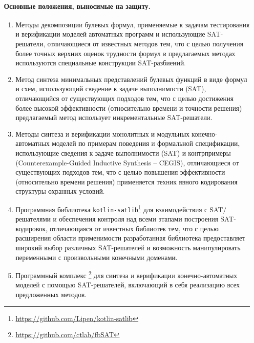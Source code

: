 %
%
\paragraph{Основные положения, выносимые на защиту.}
%
%
\begin{enumerate}[beginpenalty=10000]
    \item Методы декомпозиции булевых формул, применяемые к задачам тестирования и верификации моделей автоматных программ и использующие SAT-решатели, отличающиеся от известных методов тем, что с целью получения более точных верхних оценок трудности формул в предлагаемых методах используются специальные конструкции SAT-разбиений.

    \item Метод синтеза минимальных представлений булевых функций в виде формул и схем, использующий сведение к задаче выполнимости (SAT), отличающийся от существующих подходов тем, что с целью достижения более высокой эффективности (относительно времени и точности решения) предлагаемый метод использует инкрементальные SAT-решатели.

    \item Методы синтеза и верификации монолитных и модульных конечно-автоматных моделей по примерам поведения и формальной спецификации, использующие сведения к задаче выполнимости (SAT) и контрпримеры (Counterexample-Guided Inductive Synthesis \--- CEGIS), отличающиеся от существующих подходов тем, что с целью повышения эффективности (относительно времени решения) применяется техник явного кодирования структуры охранных условий.

    \item Программная библиотека \texttt{kotlin-satlib}\footnote{\url{https://github.com/Lipen/kotlin-satlib}} для взаимодействия с SAT\-/решателями и обеспечения контроля над всеми этапами построения SAT-кодировок, отличающаяся от известных библиотек тем, что с целью расширения области применимости разработанная библиотека предоставляет широкий выбор различных SAT-решателей и возможность манипулировать переменными с произвольными конечными доменами.

    \item Программный комплекс \footnote{\url{https://github.com/ctlab/fbSAT}} для синтеза и верификации конечно-автоматных моделей с помощью SAT-решателей, включающий в себя реализацию всех предложенных методов.
\end{enumerate}


